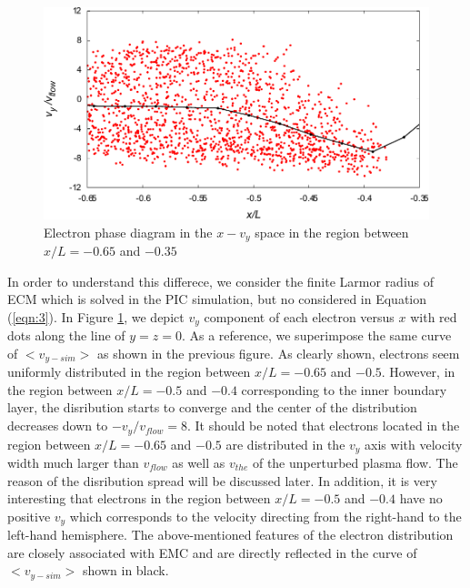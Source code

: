 \documentclass[draft,jgrga]{agutex2015}
\begin{document}
\begin{article}
\begin{figure}
\centering
\noindent\includegraphics[width=15cm]{./figures/Fig_9_bb-crop.pdf}
\caption{
Electron phase diagram in the $x-v_{y}$ space in the region between $x/L =-0.65$ and $-0.35$
}
\label{fig:9}
\end{figure}

In order to understand this differece, 
we consider the finite Larmor radius of ECM 
which is solved in the PIC simulation, 
but no considered in Equation (\ref{eqn:3}).
In Figure \ref{fig:9}, 
we depict $v_y$ component of each electron versus $x$ with red dots
along the line of $y=z=0$.
As a reference, 
we superimpose the same curve of $<v_{y-sim}>$ 
as shown in the previous figure.
As clearly shown, 
electrons seem uniformly distributed 
in the region between $x/L =-0.65$ and $-0.5$.
However, in the region between $x/L =-0.5$ and $-0.4$ 
corresponding to the inner boundary layer, 
the disribution starts to converge 
and the center of the distribution decreases down to $-v_y/v_{flow}=8$. 
It should be noted that 
electrons located in the region between $x/L =-0.65$ and $-0.5$
are distributed in the $v_y$ axis with velocity width much larger 
than $v_{flow}$ as well as $v_{the}$ of the unperturbed plasma flow. 
The reason of the disribution spread will be discussed later.
In addition, it is very interesting that electrons
in the region between $x/L =-0.5$ and $-0.4$
have no positive $v_y$ which corresponds to the velocity directing from the
right-hand to the left-hand hemisphere.
The above-mentioned features of the electron distribution are closely
associated with EMC 
and are directly reflected in the curve of $<v_{y-sim}>$ shown in black.


\end{article}
\end{document}
